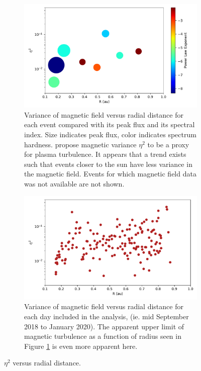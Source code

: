 \documentclass[letterpaper,11pt]{article}
\begin{document}
\begin{figure}[htbp]
\centering
\begin{subfigure}{1.\linewidth}
\centering
\includegraphics[width=0.9\linewidth]{figures/etasq_vs_R_events.pdf}
\caption{Variance of magnetic field versus radial distance for each event compared with its peak flux and its spectral index.  Size indicates peak flux, color indicates spectrum hardness. \citet{Schwadron1996} propose magnetic variance $\eta^2$ to be a proxy for plasma turbulence.  It appears that a trend exists such that events closer to the sun have less variance in the magnetic field.  Events for which magnetic field data was not available are not shown.}
\label{fig:etasq_events}
\end{subfigure}
\begin{subfigure}{1.\linewidth}
\centering
\includegraphics[width=0.9\linewidth]{figures/etasq_vs_R.pdf}
\caption{Variance of magnetic field versus radial distance for each day included in the analysis, (ie. mid September 2018 to January 2020).  The apparent upper limit of magnetic turbulence as a function of radius seen in Figure \ref{fig:etasq_events} is even more apparent here.}
\label{fig:etasq_daily}
\end{subfigure}
\caption{$\eta^2$ versus radial distance.}
\label{fig:etasq}
\end{figure}
\end{document}

